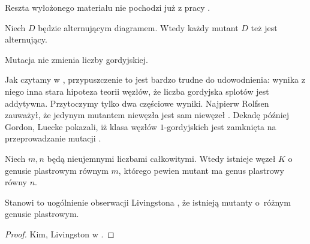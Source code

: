 Reszta wyłożonego materiału nie pochodzi już z pracy \cite{stoimenow10}.

\begin{proposition}
    Niech $D$ będzie alternującym diagramem.
    Wtedy każdy mutant $D$ też jest alternujący.
\end{proposition}

\begin{conjecture}
    Mutacja nie zmienia liczby gordyjskiej.
\end{conjecture}

Jak czytamy w \cite[problem 1.69]{kirby78}, przypuszczenie to jest bardzo trudne do udowodnienia: wynika z niego inna stara hipoteza teorii węzłów, że liczba gordyjska splotów jest addytywna.
Przytoczymy tylko dwa częściowe wyniki.
Najpierw Rolfsen zauważył, że jedynym mutantem niewęzła jest sam niewęzeł \cite{rolfsen93}.
Dekadę później Gordon, Luecke pokazali, iż klasa węzłów $1$-gordyjskich jest zamknięta na przeprowadzanie mutacji \cite{gordon06}.

\begin{proposition}
    Niech $m, n$ będą nieujemnymi liczbami całkowitymi.
    Wtedy istnieje węzeł $K$ o genusie plastrowym równym $m$, którego pewien mutant ma genus plastrowy równy $n$.
\end{proposition}

Stanowi to uogólnienie obserwacji Livingstona \cite{livingston83}, że istnieją mutanty o~różnym genusie plastrowym.

\begin{proof}
    Kim, Livingston w \cite{kim05}.
\end{proof}


